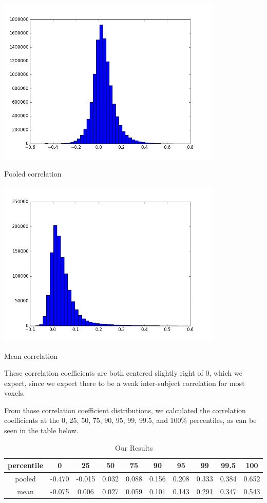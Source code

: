 \documentclass[11pt]{article}
\begin{document}
\begin{center}                                                                  
\includegraphics[height=8cm]{pooled_correlation_histogram} 
\end{center}  
Pooled correlation
\begin{center}                                                                  
\includegraphics[height=8cm]{mean_correlation_histogram} 
\end{center}  
Mean correlation

These correlation coefficients are both centered slightly right of
0, which we expect, since we expect there to be a weak inter-subject
correlation for most voxels.

From those correlation coefficient distributions, we calculated the 
correlation coefficients at the 0, 25, 50, 75, 90, 95, 99, 99.5, and 100\%
percentiles, as can be seen in the table below.
\begin{table}[ht]
  \centering
  \caption{Our Results}
  \label{tab:table1}
  \begin{tabular}{cccccccccc}
    percentile & 0 & 25 & 50 & 75 & 90 & 95 & 99 & 99.5 & 100\\
    \hline
    pooled & -0.470 & -0.015 & 0.032 & 0.088 & 0.156 & 0.208 & 0.333 & 0.384 & 0.652\\
    \hline
    mean & -0.075 & 0.006 & 0.027 & 0.059 & 0.101 & 0.143 & 0.291 & 0.347 & 0.543\\
  \end{tabular}
\end{table}
\end{document}
